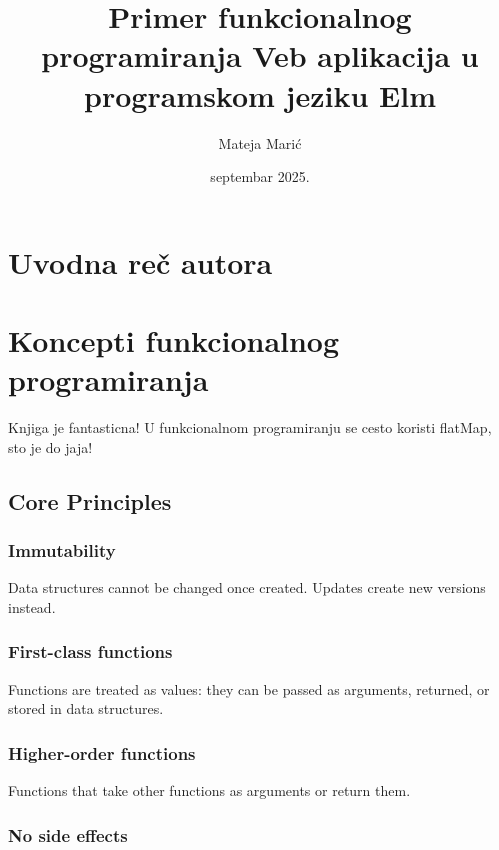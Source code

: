 \documentclass{viser-thesis}
\author{Mateja Marić}
\title{Primer funkcionalnog programiranja Veb aplikacija u programskom jeziku Elm}
\date{septembar 2025.}
\begin{document}
\maketitle
{}
\infopage
{
\pagestyle{plain}
\tableofcontents
\newpage
\pagestyle{fancy}%
}


\section{Uvodna reč autora}
\newpage

\section{Koncepti funkcionalnog programiranja}
Knjiga \textcite{feldman2020elm} je fantasticna!
U funkcionalnom programiranju se cesto koristi flatMap, sto je do jaja! \parencite{feldman2020elm}
\newpage

\subsection{Core Principles}

\subsubsection{Immutability}

Data structures cannot be changed once created. Updates create new versions instead.

\subsubsection{First-class functions}

Functions are treated as values: they can be passed as arguments, returned, or stored in data structures.

\subsubsection{Higher-order functions}

Functions that take other functions as arguments or return them.

\subsubsection{No side effects}
\end{document}
